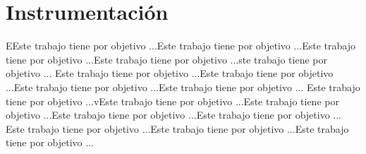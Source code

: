 \section{Instrumentación}
EEste trabajo tiene por objetivo ...Este trabajo tiene por objetivo ...Este trabajo tiene por objetivo ...Este trabajo tiene por objetivo ...ste trabajo tiene por objetivo ...
Este trabajo tiene por objetivo ...Este trabajo tiene por objetivo ...Este trabajo tiene por objetivo ...Este trabajo tiene por objetivo ...
Este trabajo tiene por objetivo ...vEste trabajo tiene por objetivo ...Este trabajo tiene por objetivo ...Este trabajo tiene por objetivo ...Este trabajo tiene por objetivo ...
Este trabajo tiene por objetivo ...Este trabajo tiene por objetivo ...Este trabajo tiene por objetivo ...
